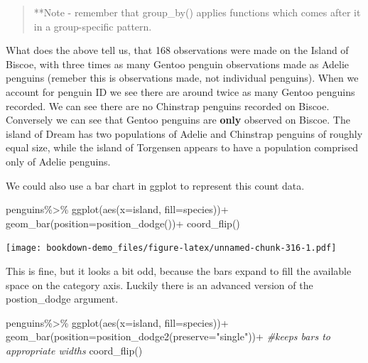 \documentclass[
]{book}
\newenvironment{Shaded}{\begin{snugshade}}{\end{snugshade}}
\newcommand{\AttributeTok}[1]{\textcolor[rgb]{0.77,0.63,0.00}{#1}}
\newcommand{\CommentTok}[1]{\textcolor[rgb]{0.56,0.35,0.01}{\textit{#1}}}
\newcommand{\FunctionTok}[1]{\textcolor[rgb]{0.00,0.00,0.00}{#1}}
\newcommand{\NormalTok}[1]{#1}
\newcommand{\SpecialCharTok}[1]{\textcolor[rgb]{0.00,0.00,0.00}{#1}}
\newcommand{\StringTok}[1]{\textcolor[rgb]{0.31,0.60,0.02}{#1}}
\begin{document}
\begin{quote}
**Note - remember that group\_by() applies functions which comes after it in a group-specific pattern.
\end{quote}

What does the above tell us, that 168 observations were made on the Island of Biscoe, with three times as many Gentoo penguin observations made as Adelie penguins (remeber this is observations made, not individual penguins). When we account for penguin ID we see there are around twice as many Gentoo penguins recorded. We can see there are no Chinstrap penguins recorded on Biscoe. Conversely we can see that Gentoo penguins are \textbf{only} observed on Biscoe.
The island of Dream has two populations of Adelie and Chinstrap penguins of roughly equal size, while the island of Torgensen appears to have a population comprised only of Adelie penguins.

We could also use a bar chart in ggplot to represent this count data.

\begin{Shaded}
\begin{Highlighting}[]
\NormalTok{penguins}\SpecialCharTok{\%\textgreater{}\%} 
  \FunctionTok{ggplot}\NormalTok{(}\FunctionTok{aes}\NormalTok{(}\AttributeTok{x=}\NormalTok{island, }\AttributeTok{fill=}\NormalTok{species))}\SpecialCharTok{+}
  \FunctionTok{geom\_bar}\NormalTok{(}\AttributeTok{position=}\FunctionTok{position\_dodge}\NormalTok{())}\SpecialCharTok{+}
  \FunctionTok{coord\_flip}\NormalTok{()}
\end{Highlighting}
\end{Shaded}

\texttt{[image: bookdown-demo\_files/figure-latex/unnamed-chunk-316-1.pdf]}

This is fine, but it looks a bit odd, because the bars expand to fill the available space on the category axis. Luckily there is an advanced version of the postion\_dodge argument.

\begin{Shaded}
\begin{Highlighting}[]
\NormalTok{penguins}\SpecialCharTok{\%\textgreater{}\%} 
  \FunctionTok{ggplot}\NormalTok{(}\FunctionTok{aes}\NormalTok{(}\AttributeTok{x=}\NormalTok{island, }\AttributeTok{fill=}\NormalTok{species))}\SpecialCharTok{+}
  \FunctionTok{geom\_bar}\NormalTok{(}\AttributeTok{position=}\FunctionTok{position\_dodge2}\NormalTok{(}\AttributeTok{preserve=}\StringTok{"single"}\NormalTok{))}\SpecialCharTok{+} 
  \CommentTok{\#keeps bars to appropriate widths}
  \FunctionTok{coord\_flip}\NormalTok{()}
\end{Highlighting}
\end{Shaded}
\end{document}
